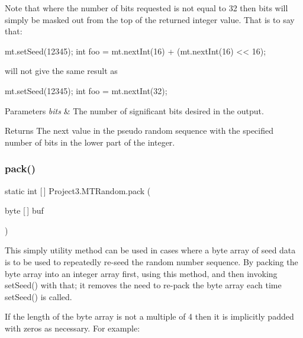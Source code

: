 Note that where the number of bits requested is not equal to 32 then bits will simply be masked out from the top of the returned integer value. That is to say that\+:


\begin{DoxyPre}
mt.setSeed(12345);
int foo = mt.nextInt(16) + (mt.nextInt(16) << 16);
\end{DoxyPre}


will not give the same result as


\begin{DoxyPre}
mt.setSeed(12345);
int foo = mt.nextInt(32);
\end{DoxyPre}



\begin{DoxyParams}{Parameters}
{\em bits} & The number of significant bits desired in the output. \\
\hline
\end{DoxyParams}
\begin{DoxyReturn}{Returns}
The next value in the pseudo random sequence with the specified number of bits in the lower part of the integer. 
\end{DoxyReturn}
\mbox{\label{class_project3_1_1_m_t_random_a072c4515dc4fffe1f96c6bf5d78f5bfc}} 
\subsubsection{\texorpdfstring{pack()}{pack()}}
{\footnotesize\ttfamily static int \mbox{[}$\,$\mbox{]} Project3.\+M\+T\+Random.\+pack (\begin{DoxyParamCaption}\item[{byte \mbox{[}$\,$\mbox{]}}]{buf }\end{DoxyParamCaption})\hspace{0.3cm}{\ttfamily [static]}}

This simply utility method can be used in cases where a byte array of seed data is to be used to repeatedly re-\/seed the random number sequence. By packing the byte array into an integer array first, using this method, and then invoking set\+Seed() with that; it removes the need to re-\/pack the byte array each time set\+Seed() is called. 

If the length of the byte array is not a multiple of 4 then it is implicitly padded with zeros as necessary. For example\+:


